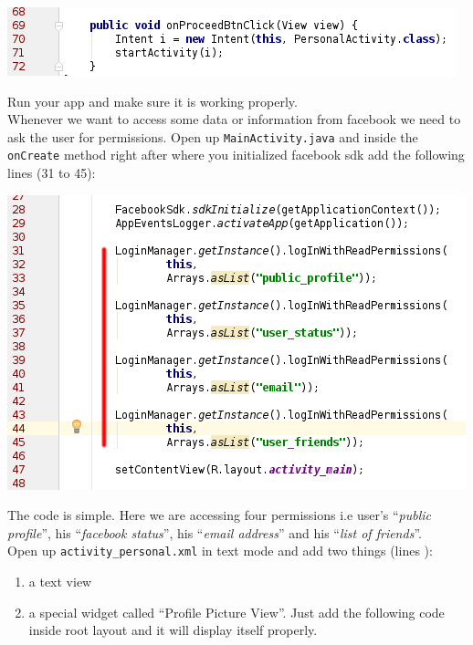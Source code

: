\begin{center}
	\includegraphics[scale=\SourceCodeScale]{chapters/ch12/images/29}
\end{center}

Run your app and make sure it is working properly. \\

Whenever we want to access some data or information from facebook we need to ask the user for permissions. Open up \texttt{MainActivity.java} and inside the \texttt{onCreate} method right after where you initialized facebook sdk add the following lines (31 to 45):

\begin{center}
	\includegraphics[scale=\SourceCodeScale]{chapters/ch12/images/30}
\end{center}

The code is simple. Here we are accessing four permissions i.e user's ``\textit{public profile}'', his ``\textit{facebook status}'', his ``\textit{email address}'' and his ``\textit{list of friends}''. \\

Open up \texttt{activity\_personal.xml} in text mode and add two things (lines ): 
\begin{enumerate}
	\item a text view
	\item a special widget called ``Profile Picture View''. Just add the following code inside root layout and it will display itself properly.
\end{enumerate}

